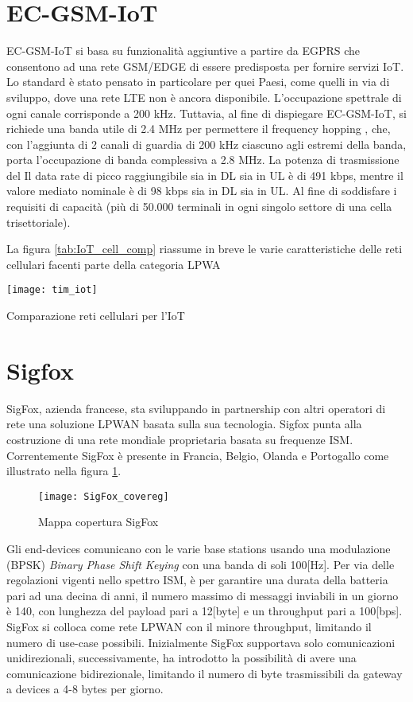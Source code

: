 \section{EC-GSM-IoT}
EC-GSM-IoT si basa su funzionalità aggiuntive a partire da EGPRS che consentono
ad una rete GSM/EDGE di essere predisposta per fornire servizi IoT. Lo standard
è stato pensato in particolare per quei Paesi, come quelli in via di sviluppo,
dove una rete LTE non è ancora disponibile. L’occupazione spettrale di ogni
canale corrisponde a  200 kHz.  Tuttavia, al fine di dispiegare EC-GSM-IoT, si
richiede una banda utile di 2.4 MHz per permettere il frequency hopping , che,
con l’aggiunta di 2 canali di guardia di 200 kHz ciascuno agli estremi della
banda, porta l’occupazione di banda complessiva a 2.8 MHz.  La
potenza di trasmissione del Il data rate di picco raggiungibile sia in DL sia in
UL è di 491 kbps, mentre il valore mediato nominale è di 98 kbps sia in DL sia
in UL. Al fine di soddisfare i requisiti di capacità (più di 50.000 terminali in
ogni singolo settore di una cella trisettoriale). 

La figura \ref{tab:IoT_cell_comp} riassume in breve le varie caratteristiche
delle reti cellulari facenti parte della categoria LPWA
\begin{table}[h]
    \centering 
                \texttt{[image: tim\_iot]}
    \caption{Comparazione reti cellulari per l'IoT}
    \label{tab:IoT_cell_comp} 
\end{table}



\section{Sigfox}
SigFox, azienda francese, sta sviluppando in partnership con altri operatori di
rete una soluzione LPWAN basata sulla sua tecnologia. Sigfox punta alla
costruzione di una rete mondiale proprietaria basata su frequenze ISM.
Correntemente SigFox è presente in Francia, Belgio, Olanda e Portogallo come
illustrato nella figura \ref{fig:Sig_covereg}.
\begin{figure}[h]
    \centering 
                \texttt{[image: SigFox\_covereg]}
    \caption{Mappa copertura SigFox}
    \label{fig:Sig_covereg} 
\end{figure}

Gli end-devices comunicano con le varie base stations usando una modulazione (BPSK)
\emph{Binary Phase Shift Keying} con una banda di soli 100[Hz]. 
Per via delle regolazioni vigenti nello spettro ISM, è per garantire una durata
della batteria pari ad una decina di anni, il numero massimo di messaggi
inviabili in un giorno è 140, con lunghezza del payload pari a 12[byte] e un
throughput pari a 100[bps]. SigFox si colloca come rete LPWAN con il minore
throughput, limitando il numero di use-case possibili. Inizialmente SigFox
supportava solo comunicazioni unidirezionali, successivamente, ha introdotto la
possibilità di avere una comunicazione bidirezionale, limitando il numero di
byte trasmissibili da gateway a devices a 4-8 bytes per giorno.

